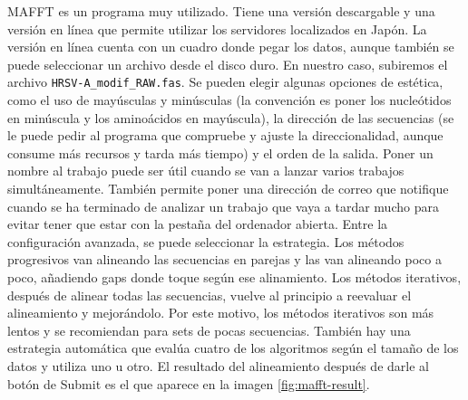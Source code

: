 MAFFT es un programa muy utilizado. Tiene una versión descargable y una versión en línea que permite utilizar los servidores localizados en Japón. La versión en línea cuenta con un cuadro donde pegar los datos, aunque también se puede seleccionar un archivo desde el disco duro. En nuestro caso, subiremos el archivo \texttt{HRSV-A\_modif\_RAW.fas}. Se pueden elegir algunas opciones de estética, como el uso de mayúsculas y minúsculas (la convención es poner los nucleótidos en minúscula y los aminoácidos en mayúscula), la dirección de las secuencias (se le puede pedir al programa que compruebe y ajuste la direccionalidad, aunque consume más recursos y tarda más tiempo) y el orden de la salida. Poner un nombre al trabajo puede ser útil cuando se van a lanzar varios trabajos simultáneamente. También permite poner una dirección de correo que notifique cuando se ha terminado de analizar un trabajo que vaya a tardar mucho para evitar tener que estar con la pestaña del ordenador abierta. Entre la configuración avanzada, se puede seleccionar la estrategia. Los métodos progresivos van alineando las secuencias en parejas y las van alineando poco a poco, añadiendo gaps donde toque según ese alinamiento. Los métodos iterativos, después de alinear todas las secuencias, vuelve al principio a reevaluar el alineamiento y mejorándolo. Por este motivo, los métodos iterativos son más lentos y se recomiendan para sets de pocas secuencias. También hay una estrategia automática que evalúa cuatro de los algoritmos según el tamaño de los datos y utiliza uno u otro. El resultado del alineamiento después de darle al botón de Submit es el que aparece en la imagen \ref{fig:mafft-result}.

